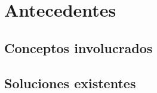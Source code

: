 \chapter{Antecedentes}
\label{sec-2}

\section{Conceptos involucrados}
\label{sec-2.1}

\section{Soluciones existentes}
\label{sec-2.2}